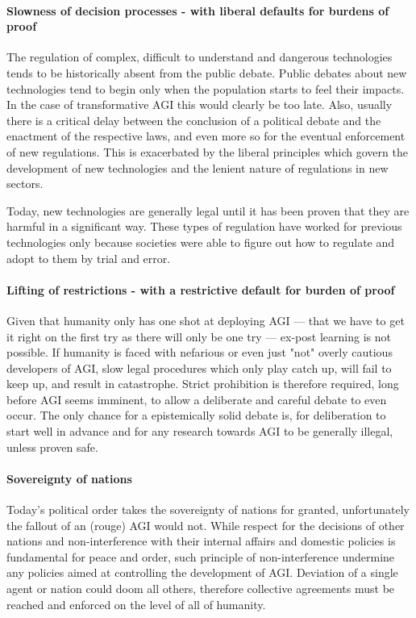 \documentclass[12pt, a4paper]{article}
\begin{document}
			\paragraph[Timing and burden of prove]{Slowness of decision processes - with liberal defaults for burdens of proof}
				The regulation of complex, difficult to understand and dangerous technologies tends to be historically absent from the public debate.
				Public debates about new technologies tend to begin only when the population starts to feel their impacts.
				In the case of transformative AGI this would clearly be too late.
				Also, usually there is a critical delay between the conclusion of a political debate and the enactment of the respective laws, and even more so for the eventual enforcement of new regulations.
				This is exacerbated by the liberal principles which govern the development of new technologies and the lenient nature of regulations in new sectors.
				
				Today, new technologies are generally legal until it has been proven that they are harmful in a significant way.
				These types of regulation have worked for previous technologies only because societies were able to figure out how to regulate and adopt to them by trial and error.
			
			\paragraph[Reversed restrictions and burden of prove]{Lifting of restrictions - with a restrictive default for burden of proof}
				Given that humanity only has one shot at deploying AGI --- that we have to get it right on the first try as there will only be one try --- ex-post learning is not possible.
				If humanity is faced with nefarious or even just "not" overly cautious developers of AGI, slow legal procedures which only play catch up, will fail to keep up, and result in catastrophe.
				Strict prohibition is therefore required, long before AGI seems imminent, to allow a deliberate and careful debate to even occur.
				The only chance for a epistemically solid debate is, for deliberation to start well in advance and for any research towards AGI to be generally illegal, unless proven safe.
			
			\paragraph{Sovereignty of nations}
				Today's political order takes the sovereignty of nations for granted, unfortunately the fallout of an (rouge) AGI would not.
				While respect for the decisions of other nations and non-interference with their internal affairs and domestic policies is fundamental for peace and order, such principle of non-interference undermine any policies aimed at controlling the development of AGI.
				Deviation of a single agent or nation could doom all others, therefore collective agreements must be reached and enforced on the level of all of humanity.
					
\end{document}
